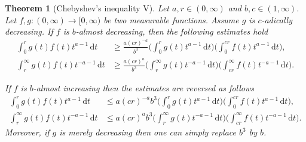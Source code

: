\documentclass[12pt, reqno]{amsart}%
\theoremstyle{plain}  %
\newtheorem{theorem}{Theorem}[section]
\theoremstyle{definition}  %
\theoremstyle{remark}
\numberwithin{equation}{section}
\renewcommand{\d}{\,\mathrm{d}}
\begin{document}
\begin{theorem}[Chebyshev's inequality V]\label{thm:chebyshev-cadic}
Let  $a,r\in (0,\infty)$ and $b, c\in (1,\infty)$.
Let $f ,g: (0, \infty) \to[0,\infty)$ be two measurable functions.  Assume $g$ is $c$-adically decreasing.
If  $f$ is $b$-almost decreasing, then the following estimates hold
\begin{align*}
\int_0^r  g(t) f(t) t^{a-1} \d t
&	\geq
\frac{a(c r)^{-a}}{b^{3}} \Big( \int_0^r  g(t) t^{a-1} \d t \Big)
\Big( \int_0^{c r} f(t) t^{a-1}\d t \Big),\\
\int_r^\infty g(t) f(t) t^{-a-1} \d t
&\geq
\frac{a(c r)^{a}}{b^{3}} \Big( \int_r^\infty  g(t) t^{-a-1} \d t \Big)
\Big( \int^\infty _{c r} f(t) t^{-a-1}\d t \Big).
\end{align*}

If $f$ is $b$-almost increasing then the estimates are reversed as follows
\begin{align*}
\int_0^r  g(t) f(t) t^{a-1} \d t
&	\leq
a(c r)^{-a} b^3\Big( \int_0^r  g(t) t^{a-1} \d t \Big)
\Big( \int_0^{c r} f(t) t^{a-1}\d t \Big),\\
\int_r^\infty g(t) f(t) t^{-a-1} \d t
&\leq
a(c r)^{a} b^3\Big(  \int_r^\infty  g(t) t^{-a-1} \d t \Big)
\Big( \int^\infty _{c r} f(t) t^{-a-1}\d t \Big).
\end{align*}
Moreover, if $g$ is merely decreasing then one can simply replace $b^3$ by $b$.
\end{theorem}
\end{document}
